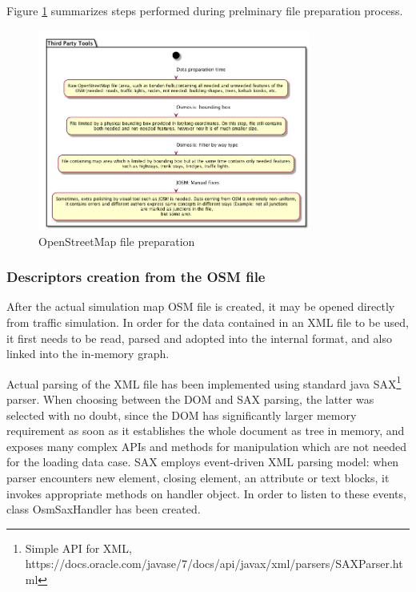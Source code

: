 Figure \ref{fig:thirdPartyToolsOSMPreparation} summarizes steps performed during prelminary file preparation process.
\begin{figure}[h]
    \caption{OpenStreetMap file preparation}
    \label{fig:thirdPartyToolsOSMPreparation}
    \centering
    \includegraphics[width=0.8\textwidth]{../../uml_diagrams/thirdPartyToolsDataLoading.png}
\end{figure}


\subsubsection{Descriptors creation from the OSM file}
After the actual simulation map OSM file is created, it may be opened directly from traffic simulation. In order for the data contained in an XML file to be used, it first needs to be read, parsed and adopted into the internal format, and also linked into the in-memory graph.

Actual parsing of the XML file has been implemented using standard java SAX\footnote{Simple API for XML, https://docs.oracle.com/javase/7/docs/api/javax/xml/parsers/SAXParser.html} parser. When choosing between the DOM and SAX parsing, the latter was selected with no doubt, since the DOM has significantly larger memory requirement as soon as it establishes the whole document as tree in memory, and exposes many complex APIs and methods for manipulation which are not needed for the loading data case. SAX employs event-driven XML parsing model: when parser encounters new element, closing element, an attribute or text blocks, it invokes appropriate methods on handler object. In order to listen to these events, class OsmSaxHandler has been created.

